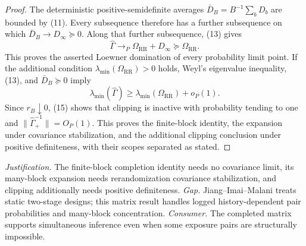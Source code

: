 \documentclass{article}
\begin{document}
\begin{proof}
The deterministic positive-semidefinite averages \(\bar D_B=B^{-1}\sum_bD_b\) are bounded by (11).  Every subsequence therefore has a further subsequence on which \(\bar D_B\to D_\infty\succeq0\).  Along that further subsequence, (13) gives
\[
 \widehat\Gamma\longrightarrow_P
 \Omega_{\mathrm{RR}}+D_\infty\succeq\Omega_{\mathrm{RR}}. \tag{14}
\]
This proves the asserted Loewner domination of every probability limit point.  If the additional condition \(\lambda_{\min}(\Omega_{\mathrm{RR}})>0\) holds, Weyl's eigenvalue inequality, (13), and \(\bar D_B\succeq0\) imply
\[
 \lambda_{\min}(\widehat\Gamma)
 \geq\lambda_{\min}(\Omega_{\mathrm{RR}})+o_P(1).          \tag{15}
\]
Since \(r_B\downarrow0\), (15) shows that clipping is inactive with probability tending to one and \(\|\widehat\Gamma_+^{-1}\|=O_P(1)\).  This proves the finite-block identity, the expansion under covariance stabilization, and the additional clipping conclusion under positive definiteness, with their scopes separated as stated.
\end{proof}
\par\smallskip\noindent \textit{Justification.} The finite-block completion identity needs no covariance limit, its many-block expansion needs rerandomization covariance stabilization, and clipping additionally needs positive definiteness. \textit{Gap.} Jiang--Imai--Malani treats static two-stage designs; this matrix result handles logged history-dependent pair probabilities and many-block concentration. \textit{Consumer.} The completed matrix supports simultaneous inference even when some exposure pairs are structurally impossible.
\end{document}
